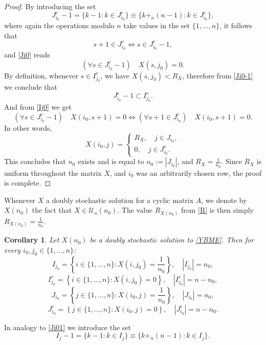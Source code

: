 \documentclass{article}
\newtheorem{corollary}{Corollary}[section]
\theoremstyle{definition}\newtheorem{example}{Example}[section]
\def\U{{\mathcal{U}}}
\begin{document}
\begin{proof}
		By introducing the set
		\begin{equation}
			\label{Ji01}J_{i_0}^c-1=\{k-1: k\in J_{i_0}^c\}\equiv \{k+_n (n-1): k\in J_{i_0}^c\},
		\end{equation}
		where again the operations modulo $n$ take values in the set $\{1,\ldots,n\}$, it follows that
		$$s+1\in J_{i_0}^c\Leftrightarrow s\in J_{i_0}^c-1,$$
		and \eqref{Ji0} reads \begin{equation}
			\label{Ji0-1} \left(\forall s\in J_{i_0}^c-1\right)\quad  X(s,j_0)=0.
		\end{equation}
		By definition, whenever $s\in I_{j_0}^c$, we have $X(s,j_0)<R_X$, therefore from \eqref{Ji0-1} we conclude that
		\begin{equation}
			J_{i_0}^c-1\subset I_{j_0}^c.
		\end{equation}
		And from \eqref{Ij0} we get
		$$\left(\forall s\in J_{i_0}^c-1\right)\quad X(i_0,s+1)=0\Leftrightarrow \left(\forall s+1\in J_{i_0}^c\right)\quad X(i_0,s+1)=0.$$
		In other words, 
		\begin{equation}\label{Xi0j}
			X(i_0,j)=\begin{cases} R_X,\quad j\in J_{i_0},\\0,\quad j\in J_{i_0}^c.
			\end{cases}
		\end{equation}
		This concludes that $n_0$ exists and is equal to $n_0:=|J_{i_0}|$, and $R_X=\frac{1}{n_0}$. Since $R_X$ is uniform throughout the matrix $X$, and $i_0$ was an arbitrarily chosen row, the proof is complete.
	\end{proof}
	Whenever $X$ a doubly stochastic solution for a cyclic matrix $A$, we denote by $X(n_0)$ the fact that $X\in\U_n(n_0)$. The value $R_{X(n_0)}$ from \eqref{R} is then simply $R_{X(n_0)}=\frac{1}{n_0}$.  
	\begin{corollary}\label{cardinality} Let $X(n_0)$ be a doubly stochastic solution to \eqref{YBME}. Then for every $i_0,j_0\in\{1,\ldots,n\}$:
		\begin{equation}
			\label{} I_{j_0}=\left\{i\in\{1,\ldots,n\}: X(i,j_0)=\frac{1}{n_0}\right\},\quad |I_{j_0}|=n_0,
		\end{equation}
		\begin{equation}
			\label{} I_{j_0}^c=\left\{i\in\{1,\ldots,n\}: X(i,j_0)=0\right\},\quad |I_{j_0}^c|=n-n_0,
		\end{equation}
		\begin{equation}
			\label{} J_{i_0}=\left\{j\in\{1,\ldots,n\}: X(i_0,j)=\frac{1}{n_0}\right\},\quad |J_{i_0}|=n_0,
		\end{equation}
		\begin{equation}
			\label{} J_{i_0}^c=\left\{j\in\{1,\ldots,n\}: X(i_0,j)=0\right\},\quad |J_{i_0}^c|=n-n_0.
		\end{equation}
	\end{corollary}
	In analogy to \eqref{Ji01} we introduce the set
	\begin{equation}
		\label{Ij1}I_{j}-1=\{k-1: k\in I_j\}\equiv \{k+_n (n-1): k\in I_j\}.
	\end{equation}
	
\end{document}
